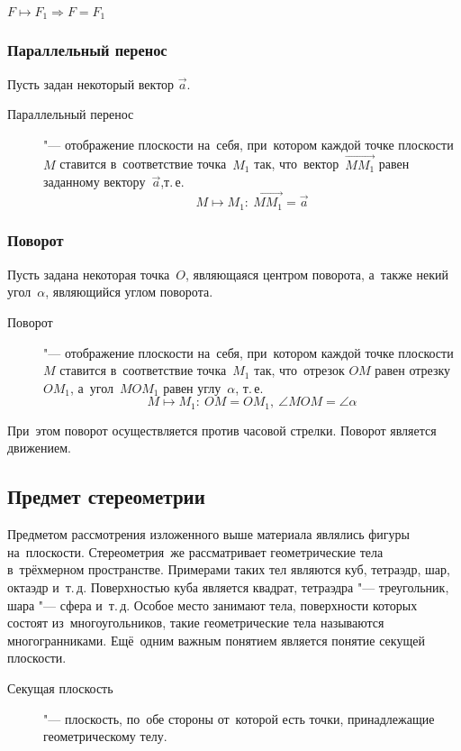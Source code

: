 \documentclass[]{scrartcl}
\begin{document}
\begin{proposition}
	$F \mapsto F_{1} \Rightarrow F=F_{1}$
\end{proposition}

\subsubsection{Параллельный перенос}
Пусть задан некоторый вектор ${\textstyle \vec{a}}$.
\begin{description}
	\item[Параллельный перенос ] "--- отображение плоскости на~себя, при~котором каждой точке плоскости~${\textstyle M}$ ставится в~соответствие точка~${\textstyle M_{1}}$ так, что~вектор~${\textstyle \vec{MM_{1}}}$ равен заданному вектору~${\textstyle \vec{a}}$,т.\,е.
	\begin{equation}
		M \mapsto M_{1}:\ \vec{MM_{1}} = \vec{a}
	\end{equation}
\end{description}

\subsubsection{Поворот}
Пусть задана некоторая точка~${\textstyle O}$, являющаяся центром поворота, а~также некий угол~${\textstyle \alpha}$, являющийся углом поворота.
\begin{description}
	\item[Поворот] "--- отображение плоскости на~себя, при~котором каждой точке плоскости~${\textstyle M}$ ставится в~соответствие точка~${\textstyle M_{1}}$ так, что~отрезок ${\textstyle OM}$ равен отрезку~${\textstyle OM_{1}}$, а~угол~${\textstyle MOM_{1}}$ равен углу~${\textstyle \alpha}$, т.\,е.
	\begin{equation}
		M \mapsto M_{1}:\ OM=OM_{1},\ \angle MOM = \angle \alpha
	\end{equation}
\end{description}
При~этом поворот осуществляется против часовой стрелки. Поворот является движением.

\subsection{Предмет стереометрии}
Предметом рассмотрения изложенного выше материала являлись фигуры на~плоскости. Стереометрия~же рассматривает геометрические тела в~трёхмерном пространстве. Примерами таких тел являются куб, тетраэдр, шар, октаэдр и~т.\,д. Поверхностью куба является квадрат, тетраэдра "--- треугольник, шара "--- сфера и~т.\,д. Особое место занимают тела, поверхности которых состоят из~многоугольников, такие геометрические тела называются многогранниками. Ещё~одним важным понятием является понятие секущей плоскости.
\begin{description}
	\item[Секущая плоскость] "--- плоскость, по~обе стороны от~которой есть точки, принадлежащие геометрическому телу.
\end{description}
\end{document}
